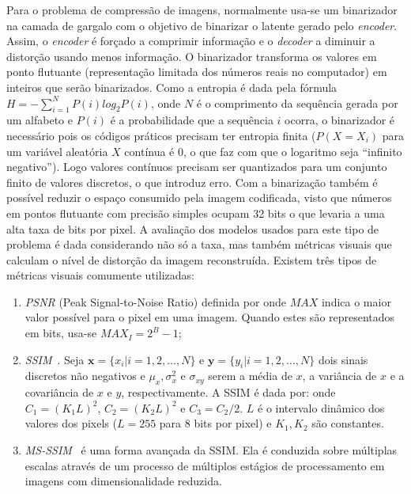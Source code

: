 Para o problema de compressão de imagens, normalmente usa-se um binarizador na camada de gargalo com o objetivo de binarizar o latente gerado pelo \textit{encoder}. Assim, o \textit{encoder} é forçado a comprimir informação e o \textit{decoder} a diminuir a distorção usando menos informação. O binarizador transforma os valores em ponto flutuante (representação limitada dos números reais no computador) em inteiros que serão binarizados.
Como a entropia é dada pela fórmula $H = -\sum_{i=1}^N P(i)log_2P(i)$, onde $N$ é o comprimento da sequência gerada por um alfabeto e $P(i)$ é a probabilidade que a sequência $i$ ocorra, o binarizador é necessário pois os códigos práticos precisam ter entropia finita ($P(X=X_i)$ para um variável aleatória $X$ contínua é 0, o que faz com que o logaritmo seja ``infinito negativo''). Logo valores contínuos precisam ser quantizados para um conjunto finito de valores discretos, o que introduz erro. Com a binarização também é possível reduzir o espaço consumido pela imagem codificada, visto que números em pontos flutuante com precisão simples ocupam 32 bits o que levaria a uma alta taxa de bits por pixel. A avaliação dos modelos usados para este tipo de problema é dada considerando não só a taxa, mas também métricas visuais que calculam o nível de distorção da imagem reconstruída. Existem três tipos de métricas visuais comumente utilizadas:
\begin{enumerate}
    \item \textit{\acrshort{PSNR}} (Peak Signal-to-Noise Ratio) definida por  onde $MAX$ indica o maior valor possível para o pixel em uma imagem. Quando estes são representados em bits, usa-se $MAX_I = 2^B - 1$;
    \item \textit{\acrshort{SSIM}}~\cite{wang2004image}. Seja $\mathbf{x} = \{x_i|i = 1,2,\dots,N\}$ e $\mathbf{y} = \{y_i|i = 1,2,\dots,N\}$ dois sinais discretos não negativos e $\mu_x, \sigma_x^2$ e $\sigma_{xy}$ serem a média de $x$, a variância de $x$ e a covariância de $x$ e $y$, respectivamente. A \acrshort{SSIM} é dada por:
     onde $C_1 = {(K_1L)}^2$, $C_2 = {(K_2L)}^2$ e $C_3 = C_2/2$. $L$ é o intervalo dinâmico dos valores dos pixels ($L = 255$ para 8 bits por pixel) e $K_1, K_2$ são constantes.
    \item \textit{\acrshort{MS-SSIM}}~\cite{wang2003multiscale} é uma forma avançada da \acrshort{SSIM}. Ela é conduzida sobre múltiplas escalas através de um processo de múltiplos estágios de processamento em imagens com dimensionalidade reduzida.
\end{enumerate}

